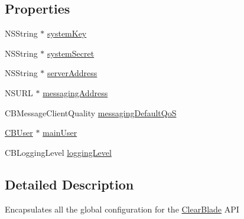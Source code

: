 \subsection*{Properties}
\begin{DoxyCompactItemize}
\item 
N\+S\+String $\ast$ \hyperlink{interface_clear_blade_aab0eaf0d5cb8cabae0889b19230859b5}{system\+Key}
\item 
N\+S\+String $\ast$ \hyperlink{interface_clear_blade_ac86550adaf64238807f4bc536af7d1d0}{system\+Secret}
\item 
N\+S\+String $\ast$ \hyperlink{interface_clear_blade_a254d692b3e85e4d33a4518e9ff9e4f40}{server\+Address}
\item 
N\+S\+U\+R\+L $\ast$ \hyperlink{interface_clear_blade_a6d90355650360ef27ac6aad5f3df2a7b}{messaging\+Address}
\item 
C\+B\+Message\+Client\+Quality \hyperlink{interface_clear_blade_a886dc9ea49818af85910b4373f95096b}{messaging\+Default\+Qo\+S}
\item 
\hyperlink{interface_c_b_user}{C\+B\+User} $\ast$ \hyperlink{interface_clear_blade_a2c5ec6113244b327a374c1f939efbce5}{main\+User}
\item 
C\+B\+Logging\+Level \hyperlink{interface_clear_blade_a63988be37c99a5e90c91b89be9106a5d}{logging\+Level}
\end{DoxyCompactItemize}


\subsection{Detailed Description}
Encapsulates all the global configuration for the \hyperlink{interface_clear_blade}{Clear\+Blade} A\+P\+I 

